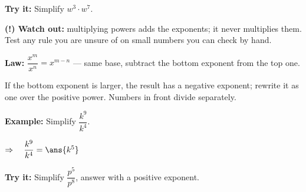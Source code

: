 \documentclass[12pt]{article}
\begin{document}
\begin{tryitbox}
\textbf{Try it:} \quad Simplify $w^3 \cdot w^7$.\\[2pt]
\end{tryitbox}

\begin{watchoutbox}
\textbf{(!) Watch out:} multiplying powers adds the exponents; it never multiplies them.
Test any rule you are unsure of on small numbers you can check by hand.
\end{watchoutbox}


\begin{formulabox}
\textbf{Law:} \quad $\dfrac{x^m}{x^n} = x^{m-n}$ \quad --- same base, subtract the bottom
exponent from the top one.
\par\smallskip
If the bottom exponent is larger, the result has a negative exponent; rewrite it as one
over the positive power. Numbers in front divide separately.
\end{formulabox}

\begin{examplebox}
\textbf{Example:} \quad Simplify $\dfrac{k^9}{k^4}$.

$\Rightarrow\quad \dfrac{k^9}{k^4} = \ans{k^5}$
\end{examplebox}

\begin{tryitbox}
\textbf{Try it:} \quad Simplify $\dfrac{p^5}{p^8}$, answer with a positive exponent.\\[2pt]
\end{tryitbox}
\end{document}
